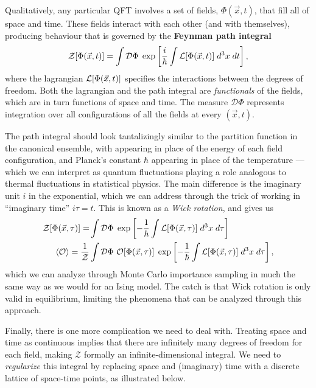 Qualitatively, any particular QFT involves a set of fields, $\Phi(\vec x, t)$, that fill all of space and time.
These fields interact with each other (and with themselves), producing behaviour that is governed by the \textbf{Feynman path integral}
\begin{equation*}
  \mathcal Z[\Phi(\vec x, t)] = \int\mathcal D \Phi \; \exp\left[\frac{i}{\hbar} \int \mathcal L[\Phi(\vec x, t)] \; d^3x \; dt\right],
\end{equation*}
where the lagrangian $\mathcal L[\Phi(\vec x, t)]$ specifies the interactions between the degrees of freedom.
Both the lagrangian and the path integral are \textit{functionals} of the fields, which are in turn functions of space and time.
The measure $\mathcal D \Phi$ represents integration over all configurations of all the fields at every $(\vec x, t)$.

The path integral should look tantalizingly similar to the partition function in the canonical ensemble, with \cL appearing in place of the energy of each field configuration, and Planck's constant $\hbar$ appearing in place of the temperature --- which we can interpret as quantum fluctuations playing a role analogous to thermal fluctuations in statistical physics.
The main difference is the imaginary unit $i$ in the exponential, which we can address through the trick of working in ``imaginary time'' $i\tau = t$.
This is known as a \textit{Wick rotation}, and gives us
\begin{align*}
  \mathcal Z[\Phi(\vec x, \tau)] = & \int\mathcal D \Phi \; \exp\left[-\frac{1}{\hbar} \int \cL[\Phi(\vec x, \tau)] \; d^3x \; d\tau \right] \\
  \vev{\cO}  = \frac{1}{\mathcal Z} & \int\mathcal D \Phi \ \cO[\Phi(\vec x, \tau)] \; \exp\left[-\frac{1}{\hbar} \int \cL[\Phi(\vec x, \tau)] \; d^3x \; d\tau \right],
\end{align*}
which we can analyze through Monte Carlo importance sampling in much the same way as we would for an Ising model.
The catch is that Wick rotation is only valid in equilibrium, limiting the phenomena that can be analyzed through this approach.

Finally, there is one more complication we need to deal with.
Treating space and time as continuous implies that there are infinitely many degrees of freedom for each field, making $\mathcal Z$ formally an infinite-dimensional integral.
We need to \textit{regularize} this integral by replacing space and (imaginary) time with a discrete lattice of space-time points, as illustrated below.

